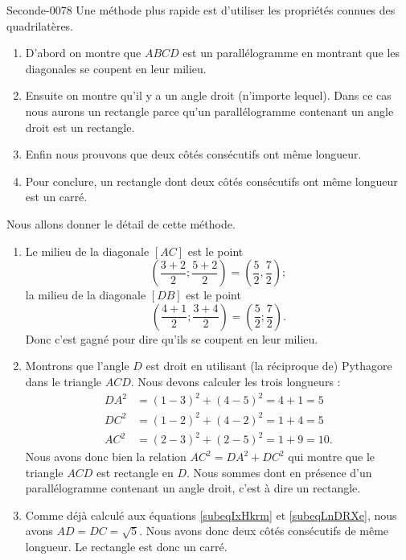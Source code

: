 \begin{corrige}{Seconde-0078}
    Une méthode plus rapide est d'utiliser les propriétés connues des quadrilatères.
    \begin{enumerate}
        \item
            D'abord on montre que \( ABCD\) est un parallélogramme en montrant que les diagonales se coupent en leur milieu.
        \item
            Ensuite on montre qu'il y a un angle droit (n'importe lequel). Dans ce cas nous aurons un rectangle parce qu'un parallélogramme contenant un angle droit est un rectangle.
        \item
            Enfin nous prouvons que deux côtés consécutifs ont même longueur.
        \item
            Pour conclure, un rectangle dont deux côtés consécutifs ont même longueur est un carré.
    \end{enumerate}
    Nous allons donner le détail de cette méthode.
    \begin{enumerate}
        \item
            Le milieu de la diagonale \( [AC]\) est le point
            \begin{equation}
                \left( \frac{ 3+2 }{2};\frac{ 5+2 }{2} \right)=\left( \frac{ 5 }{2},\frac{ 7 }{2} \right);
            \end{equation}
            la milieu de la diagonale \( [DB]\) est le point
            \begin{equation}
                \left( \frac{ 4+1 }{2};\frac{ 3+4 }{2} \right)=\left( \frac{ 5 }{2};\frac{ 7 }{2} \right).
            \end{equation}
            Donc c'est gagné pour dire qu'ils se coupent en leur milieu.
        \item
            Montrons que l'angle \( D\) est droit en utilisant (la réciproque de) Pythagore dans le triangle \( ACD\). Nous devons calculer les trois longueurs :
            \begin{subequations}
                \begin{align}
                    DA^2&=(1-3)^2+(4-5)^2=4+1=5     \label{subeqIxHkrm}\\
                    DC^2&=(1-2)^2+(4-2)^2=1+4=5     \label{subeqLnDRXe}\\
                    AC^2&=(2-3)^2+(2-5)^2=1+9=10.
                \end{align}
            \end{subequations}
            Nous avons donc bien la relation \( AC^2=DA^2+DC^2\) qui montre que le triangle \( ACD\) est rectangle en \( D\). Nous sommes dont en présence d'un parallélogramme contenant un angle droit, c'est à dire un rectangle.

        \item
            Comme déjà calculé aux équations \eqref{subeqIxHkrm} et \eqref{subeqLnDRXe}, nous avons \( AD=DC=\sqrt{5}\). Nous avons donc deux côtés consécutifs de même longueur. Le rectangle est donc un carré.
    \end{enumerate}

\end{corrige}
